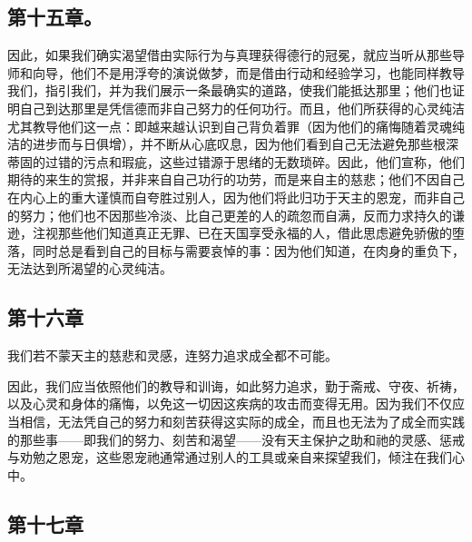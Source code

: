 
\subsection{第十五章。}

\par

因此，如果我们确实渴望借由实际行为与真理获得德行的冠冕，就应当听从那些导师和向导，他们不是用浮夸的演说做梦，而是借由行动和经验学习，也能同样教导我们，指引我们，并为我们展示一条最确实的道路，使我们能抵达那里；他们也证明自己到达那里是凭信德而非自己努力的任何功行。而且，他们所获得的心灵纯洁尤其教导他们这一点：即越来越认识到自己背负着罪（因为他们的痛悔随着灵魂纯洁的进步而与日俱增），并不断从心底叹息，因为他们看到自己无法避免那些根深蒂固的过错的污点和瑕疵，这些过错源于思绪的无数琐碎。因此，他们宣称，他们期待的来生的赏报，并非来自自己功行的功劳，而是来自主的慈悲；他们不因自己在内心上的重大谨慎而自夸胜过别人，因为他们将此归功于天主的恩宠，而非自己的努力；他们也不因那些冷淡、比自己更差的人的疏忽而自满，反而力求持久的谦逊，注视那些他们知道真正无罪、已在天国享受永福的人，借此思虑避免骄傲的堕落，同时总是看到自己的目标与需要哀悼的事：因为他们知道，在肉身的重负下，无法达到所渴望的心灵纯洁。\par


\subsection{第十六章}

我们若不蒙天主的慈悲和灵感，连努力追求成全都不可能。\par

因此，我们应当依照他们的教导和训诲，如此努力追求，勤于斋戒、守夜、祈祷，以及心灵和身体的痛悔，以免这一切因这疾病的攻击而变得无用。因为我们不仅应当相信，无法凭自己的努力和刻苦获得这实际的成全，而且也无法为了成全而实践的那些事——即我们的努力、刻苦和渴望——没有天主保护之助和祂的灵感、惩戒与劝勉之恩宠，这些恩宠祂通常通过别人的工具或亲自来探望我们，倾注在我们心中。\par


\subsection{第十七章}

